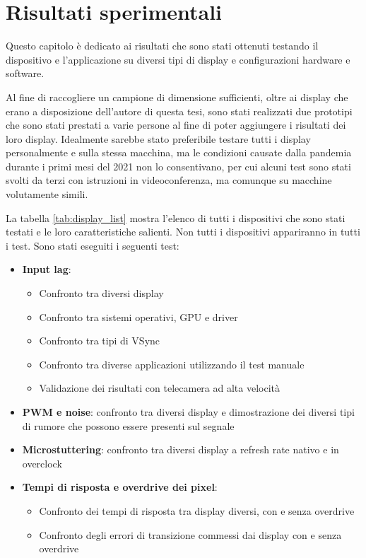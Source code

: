 \setlength{\parskip}{1em}
\setlength{\parindent}{0pt}
\chapter{Risultati sperimentali}
\label{chap:expdata}

Questo capitolo è dedicato ai risultati che sono stati ottenuti testando il dispositivo e l'applicazione su diversi tipi di display e configurazioni hardware e software.

Al fine di raccogliere un campione di dimensione sufficienti, oltre ai display che erano a disposizione dell'autore di questa tesi, sono stati realizzati due prototipi che sono stati prestati a varie persone al fine di poter aggiungere i risultati dei loro display. Idealmente sarebbe stato preferibile testare tutti i display personalmente e sulla stessa macchina, ma le condizioni causate dalla pandemia durante i primi mesi del 2021 non lo consentivano, per cui alcuni test sono stati svolti da terzi con istruzioni in videoconferenza, ma comunque su macchine volutamente simili.

La tabella \ref{tab:display_list} mostra l'elenco di tutti i dispositivi che sono stati testati e le loro caratteristiche salienti. Non tutti i dispositivi appariranno in tutti i test. Sono stati eseguiti i seguenti test:\begin{itemize}
	\item \textbf{Input lag}:\begin{itemize}
		\item Confronto tra diversi display
		\item Confronto tra sistemi operativi, GPU e driver
		\item Confronto tra tipi di VSync
		\item Confronto tra diverse applicazioni utilizzando il test manuale
		\item Validazione dei risultati con telecamera ad alta velocità
	\end{itemize}
	\item \textbf{PWM e noise}: confronto tra diversi display e dimostrazione dei diversi tipi di rumore che possono essere presenti sul segnale
	\item \textbf{Microstuttering}: confronto tra diversi display a refresh rate nativo e in overclock
	\item \textbf{Tempi di risposta e overdrive dei pixel}:\begin{itemize}
		\item Confronto dei tempi di risposta tra display diversi, con e senza overdrive
		\item Confronto degli errori di transizione commessi dai display con e senza overdrive
	\end{itemize}
\end{itemize}

